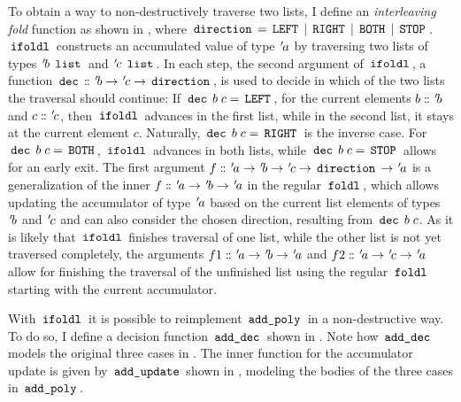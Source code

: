 To obtain a way to non-destructively traverse two lists, I define an \textit{interleaving fold} function as shown in , where $\,\text{\ttfamily direction}\, = \,\text{\ttfamily LEFT}\, \mid \,\text{\ttfamily RIGHT}\, \mid \,\text{\ttfamily BOTH}\, \mid \,\text{\ttfamily STOP}\,$.
$\,\text{\ttfamily ifoldl}\,$ constructs an accumulated value of type ${\mskip2mu '\mskip-2mua}$ by traversing two lists of types ${\mskip2mu '\mskip-2mub} \; \,\text{\ttfamily list}\,$ and ${\mskip2mu '\mskip-2muc} \; \,\text{\ttfamily list}\,$.
In each step, the second argument of $\,\text{\ttfamily ifoldl}\,$, a function $\,\text{\ttfamily dec}\, \mathrel{\mathord{:}\mkern-1.2mu\mathord{:}} {\mskip2mu '\mskip-2mub} \rightarrow {\mskip2mu '\mskip-2muc} \rightarrow \,\text{\ttfamily direction}\,$, is used to decide in which of the two lists the traversal should continue:
If $\,\text{\ttfamily dec}\, \; b \; c = \,\text{\ttfamily LEFT}\,$, for the current elements $b \mathrel{\mathord{:}\mkern-1.2mu\mathord{:}} {\mskip2mu '\mskip-2mub}$ and $c \mathrel{\mathord{:}\mkern-1.2mu\mathord{:}} {\mskip2mu '\mskip-2muc}$, then $\,\text{\ttfamily ifoldl}\,$ advances in the first list, while in the second list, it stays at the current element $c$.
Naturally, $\,\text{\ttfamily dec}\, \; b \; c = \,\text{\ttfamily RIGHT}\,$ is the inverse case.
For $\,\text{\ttfamily dec}\, \; b \; c = \,\text{\ttfamily BOTH}\,$, $\,\text{\ttfamily ifoldl}\,$ advances in both lists, while $\,\text{\ttfamily dec}\, \; b \; c = \,\text{\ttfamily STOP}\,$ allows for an early exit.
The first argument $f \mathrel{\mathord{:}\mkern-1.2mu\mathord{:}} {\mskip2mu '\mskip-2mua} \rightarrow {\mskip2mu '\mskip-2mub} \rightarrow {\mskip2mu '\mskip-2muc} \rightarrow \,\text{\ttfamily direction}\, \rightarrow {\mskip2mu '\mskip-2mua}$ is a generalization of the inner $f \mathrel{\mathord{:}\mkern-1.2mu\mathord{:}} {\mskip2mu '\mskip-2mua} \rightarrow {\mskip2mu '\mskip-2mub} \rightarrow {\mskip2mu '\mskip-2mua}$ in the regular $\,\text{\ttfamily foldl}\,$, which allows updating the accumulator of type ${\mskip2mu '\mskip-2mua}$ based on the current list elements of types ${\mskip2mu '\mskip-2mub}$ and ${\mskip2mu '\mskip-2muc}$ and can also consider the chosen direction, resulting from $\,\text{\ttfamily dec}\, \; b \; c$.
As it is likely that $\,\text{\ttfamily ifoldl}\,$ finishes traversal of one list, while the other list is not yet traversed completely, the arguments $f1 \mathrel{\mathord{:}\mkern-1.2mu\mathord{:}} {\mskip2mu '\mskip-2mua} \rightarrow {\mskip2mu '\mskip-2mub} \rightarrow {\mskip2mu '\mskip-2mua}$ and $f2 \mathrel{\mathord{:}\mkern-1.2mu\mathord{:}} {\mskip2mu '\mskip-2mua} \rightarrow {\mskip2mu '\mskip-2muc} \rightarrow {\mskip2mu '\mskip-2mua}$ allow for finishing the traversal of the unfinished list using the regular $\,\text{\ttfamily foldl}\,$ starting with the current accumulator.

With $\,\text{\ttfamily ifoldl}\,$ it is possible to reimplement $\,\text{\ttfamily add\_poly}\,$ in a non-destructive way.
To do so, I define a decision function $\,\text{\ttfamily add\_dec}\,$ shown in .
Note how $\,\text{\ttfamily add\_dec}\,$ models the original three cases in .
The inner function for the accumulator update is given by $\,\text{\ttfamily add\_update}\,$ shown in , modeling the bodies of the three cases in $\,\text{\ttfamily add\_poly}\,$.

